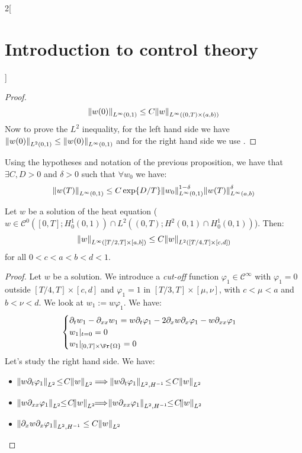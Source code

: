 \documentclass[../../../main_math.tex]{subfiles}
\begin{document}
\begin{multicols}{2}[\section{Introduction to control theory}]
\begin{proof}
    $$
      \norm{w(0)}_{L^\infty (0,1)}\leq C\norm{w}_{L^\infty((0,T)\times (a,b))}
    $$
    Now to prove the $L^2$ inequality, for the left hand side we have $\norm{w(0)}_{L^2(0,1)}\leq \norm{w(0)}_{L^\infty(0,1)}$ and for the right hand side we use .
  \end{proof}
  \begin{lemma}\label{ICT:lemma1Dobservability}
    Using the hypotheses and notation of the previous proposition, we have that $\exists C,D>0$ and $\delta>0$ such that $\forall w_0$ we have:
    $$
      \norm{w(T)}_{L^\infty(0,1)}\leq C\exp{D/T}\norm{w_0}_{L^\infty(0,1)}^{1-\delta}\norm{w(T)}_{L^\infty(a,b)}^\delta
    $$
  \end{lemma}
  \begin{lemma}\label{ICT:interiorregularity}
    Let $w$ be a solution of the heat equation ($w\in \mathcal{C}^0([0,T]; H_0^1(0,1))\cap L^2((0,T); H^2(0,1)\cap H_0^1(0,1))$). Then:
    $$
      \norm{w}_{L^\infty([T/2,T]\times [a,b])}\leq C\norm{w}_{L^2([T/4,T] \times [c,d])}
    $$
    for all $0<c<a<b<d<1$.
  \end{lemma}
  \begin{proof}
    Let $w$ be a solution. We introduce a \textit{cut-off} function $\varphi_1\in\mathcal{C}^\infty$ with $\varphi_1=0$ outside $[T/4,T]\times [c,d]$ and $\varphi_1=1$ in $[T/3,T]\times [\mu,\nu]$, with $c<\mu<a$ and $b<\nu<d$. We look at $w_1:=w\varphi_1$. We have:
    $$
      \begin{cases}
        \partial_t w_1 - \partial_{xx}w_1=w\partial_t\varphi_1-2\partial_x w\partial_x\varphi_1-w\partial_{xx}\varphi_1 \\
        w_1|_{t=0} = 0                                                                                                  \\
        w_1|_{[0,T]\times\Fr{\Omega}}=0
      \end{cases}
    $$
    Let's study the right hand side. We have:
    \begin{itemize}
      \item $\!\!\norm{w\partial_t\varphi_1}_{L^2}\!\leq \!C \norm{w}_{L^2}\!\!\implies\!\! \norm{w\partial_t\varphi_1}_{L^2,H^{-1}}\!\leq\! C \norm{w}_{L^2}$
      \item $\!\!\norm{w\partial_{xx}\varphi_1}_{L^2}\!\!\leq\! C\! \norm{w}_{L^2} \!\!\!\!\implies\!\!\! \norm{w\partial_{xx}\varphi_1}_{L^2,H^{-1}}\!\!\leq\! C \!\norm{w}_{L^2}$
      \item $\!\!\norm{\partial_x w\partial_x\varphi_1}_{L^2,H^{-1}}\leq C \norm{w}_{L^2}$

\end{itemize}
\end{proof}
\end{multicols}
\end{document}
